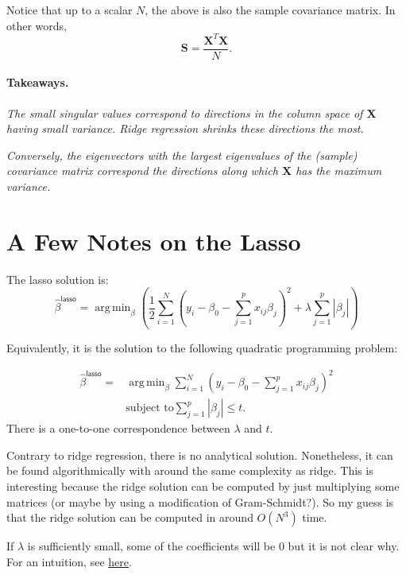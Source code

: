 \documentclass[11pt]{article}
\theoremstyle{definition}
\newcommand{\XX}{\mathbf{X}}
\renewcommand{\SS}{\mathbf{S}}
\newcommand{\lasso}{\textsf{lasso}}
\DeclareMathOperator*{\argmin}{arg\,min} \DeclareMathOperator*{\Cov}{Cov}
\begin{document}
Notice that up to a scalar $N$, the above is also the sample covariance matrix.
In other words,
\[\SS=\frac{\XX^T\XX}{N}.\]

\paragraph{Takeaways.}
\begin{center}
	\emph{ The small singular values correspond to directions in the column
		space of $\XX$ having small variance. Ridge regression shrinks these
		directions the most.}
\end{center}

\begin{center}
	\emph{ Conversely, the eigenvectors with the largest eigenvalues of the
		(sample) covariance matrix correspond the directions along which $\XX$ has
		the maximum variance.}
\end{center}

\section{A Few Notes on the Lasso}
The lasso solution is:
\[
	\hat\beta^\lasso=\argmin_\beta \left(\frac{1}{2}\sum_{i=1}^N \left(y_i - \beta_0 - \sum_{j=1}^p x_{ij}\beta_j\right)^2 + \lambda\sum_{j=1}^p|\beta_j|\right)\]

Equivalently, it is the solution to the following quadratic programming problem:

\begin{equation}
	\begin{split}
		\hat\beta^\lasso = &\argmin_\beta \sum_{i=1}^N \left(y_i-\beta_0-\sum_{j=1}^px_{ij}\beta_j\right)^2 \\
		& \text{subject to} \sum_{j=1}^p|\beta_j| \le t.
	\end{split}
\end{equation}
There is a one-to-one correspondence between $\lambda$ and $t$.

Contrary to ridge regression, there is no analytical solution. Nonetheless, it
can be found algorithmically with around the same complexity as ridge. This is
interesting because the ridge solution can be computed by just multiplying some
matrices (or maybe by using a modification of Gram-Schmidt?). So my guess is
that the ridge solution can be computed in around $O(N^3)$ time.

If $\lambda$ is sufficiently small, some of the coefficients will be 0 but it is
not clear why. For an intuition, see
\href{https://stats.stackexchange.com/questions/74542/why-does-the-lasso-provide-variable-selection}{here}.
\end{document}
